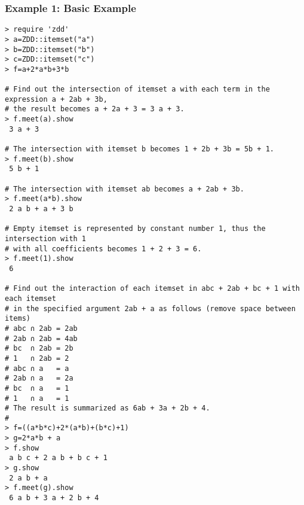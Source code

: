 \subsubsection*{Example 1: Basic Example}



\begin{Verbatim}[baselinestretch=0.7,frame=single]
> require 'zdd'
> a=ZDD::itemset("a")
> b=ZDD::itemset("b")
> c=ZDD::itemset("c")
> f=a+2*a*b+3*b

# Find out the intersection of itemset a with each term in the expression a + 2ab + 3b, 
# the result becomes a + 2a + 3 = 3 a + 3.
> f.meet(a).show
 3 a + 3

# The intersection with itemset b becomes 1 + 2b + 3b = 5b + 1.
> f.meet(b).show
 5 b + 1

# The intersection with itemset ab becomes a + 2ab + 3b.
> f.meet(a*b).show
 2 a b + a + 3 b

# Empty itemset is represented by constant number 1, thus the intersection with 1
# with all coefficients becomes 1 + 2 + 3 = 6.
> f.meet(1).show
 6

# Find out the interaction of each itemset in abc + 2ab + bc + 1 with each itemset 
# in the specified argument 2ab + a as follows (remove space between items) 
# abc ∩ 2ab = 2ab
# 2ab ∩ 2ab = 4ab
# bc  ∩ 2ab = 2b
# 1   ∩ 2ab = 2
# abc ∩ a   = a
# 2ab ∩ a   = 2a
# bc  ∩ a   = 1
# 1   ∩ a   = 1
# The result is summarized as 6ab + 3a + 2b + 4.
#
> f=((a*b*c)+2*(a*b)+(b*c)+1)
> g=2*a*b + a
> f.show
 a b c + 2 a b + b c + 1
> g.show
 2 a b + a
> f.meet(g).show
 6 a b + 3 a + 2 b + 4
\end{Verbatim}
